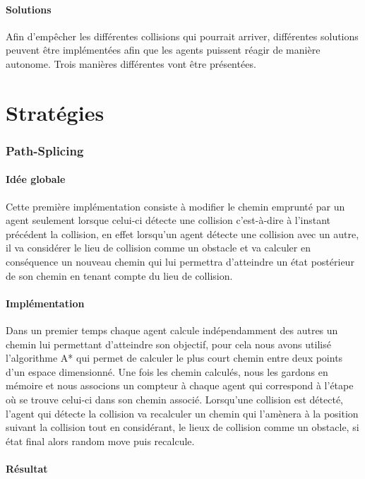 \documentclass{article}
\begin{document}
			\subsection{Solutions}
				Afin d'empêcher les différentes collisions qui pourrait arriver, différentes solutions peuvent être implémentées afin que les agents puissent réagir de manière autonome. Trois manières différentes vont être présentées.
					
	\part{Stratégies}
	
		\section{Path-Splicing}
		
			\subsection{Idée globale}
			
			Cette première implémentation consiste à modifier le chemin emprunté par un agent seulement lorsque celui-ci détecte une collision c'est-à-dire à l'instant précédent la collision, en effet lorsqu'un agent détecte une collision avec un autre, il va considérer le lieu de collision comme un obstacle et va calculer en conséquence un nouveau chemin qui lui permettra d'atteindre un état postérieur de son chemin en tenant compte du lieu de collision.
			
			\subsection{Implémentation}
			
			Dans un premier temps chaque agent calcule indépendamment des autres un chemin lui permettant d'atteindre son objectif, pour cela nous avons utilisé l'algorithme A* qui permet de calculer le plus court chemin entre deux points d'un espace dimensionné.
			Une fois les chemin calculés, nous les gardons en mémoire et nous associons un compteur à chaque agent qui correspond à l'étape où se trouve celui-ci dans son chemin associé. Lorsqu'une collision est détecté, l'agent qui détecte la collision va recalculer un chemin qui l'amènera à la position suivant la collision tout en considérant, le lieux de collision comme un obstacle, si état final alors random move puis recalcule.
			
			\subsection{Résultat}
\end{document}
